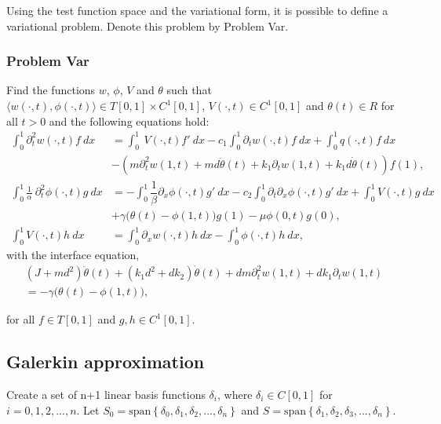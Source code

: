 \documentclass[../../main.tex]{subfiles}
\begin{document}
Using the test function space and the variational form, it is possible to define a variational problem. Denote this problem by Problem Var.

\subsubsection{Problem Var} Find the functions $w$, $\phi$, $V$ and $\theta$ such that $\langle w(\cdot,t), \phi(\cdot,t) \rangle \in T[0,1] \times C^1[0,1]$, $V(\cdot,t) \in C^1[0,1]$ and $\theta(t) \in R$ for all $t>0$ and the following equations hold:
\begin{align}
\int_0^1 \partial^2_t w(\cdot,t) f \ dx  & =   \int_0^1~ V(\cdot,t) f' \ dx - c_1\int_0^1 \partial_t w(\cdot,t)f \ dx + \int_0^1q(\cdot,t)f \ dx \nonumber \\
 &  -(m \partial_t^2 w(1,t) +  md \ddot \theta(t) + k_1 \partial_t w(1,t) + k_1 d \dot \theta(t))f(1), \label{CT_18}\\
\int_0^1 \frac{1}{\alpha}~\partial^2_t \phi(\cdot,t) g \ dx  &= -\int_0^1\dfrac{1}{\beta} \partial_x \phi(\cdot,t)g' \ dx - c_2 \int_0^1 \partial_t \partial_x \phi(\cdot,t)g' \ dx + \int_0^1 V(\cdot,t)g \ dx \nonumber \\
 &  +\gamma \big(\theta(t) - \phi(1,t)\big)g(1) - \mu \phi(0,t)g(0), \label{CT_19}\\
\int_0^1 V(\cdot,t)h \ dx &= \int_0^1 \partial_x w(\cdot,t)h \ dx - \int_0^1 \phi(\cdot,t)h \ dx,  \label{CT_20}
\end{align}
with the interface equation,
\begin{align}
(J+ md^2) \ddot \theta(t)+ (k_1d^2 + d k_2) \dot \theta(t)  + dm \partial_t^2 w(1,t)
  + dk_1 \partial_t w(1,t) \nonumber\\
  =  -\gamma \big(\theta(t) - \phi(1,t)\big),  \label{CT_21}
\end{align}

for all $f \in T[0,1]$ and $g,h \in C^1[0,1]$.\\




\subsection{Galerkin approximation}
Create a set of n+1 linear basis functions $\delta_i$, where $\delta_i \in C[0,1]$ for $i = 0,1,2,...,n$. Let $S_0 = \textrm{span}\left\{\delta_0,\delta_1,\delta_2,...,\delta_n\right\}$ and $S = \textrm{span}\left\{\delta_1,\delta_2,\delta_3,...,\delta_n\right\}$. \label{sym:span}
\end{document}
